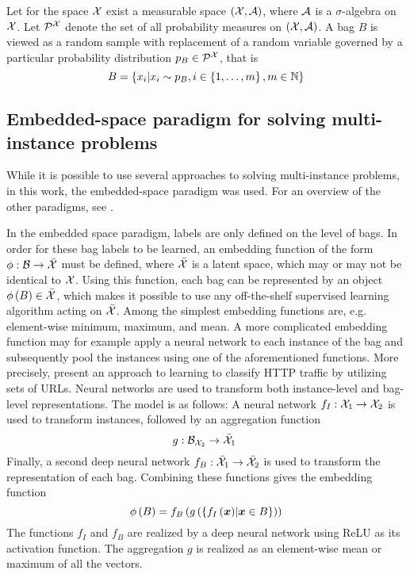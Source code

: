 Let for the space \( \mathcal{X} \) exist a measurable space \( \left( \mathcal{X}, \mathcal{A} \right) \), where \( \mathcal{A} \) is a \( \sigma \)-algebra on \( \mathcal{X} \). Let \( \mathcal{P}^\mathspace{X} \) denote the set of all probability measures on \( \left( \mathcal{X}, \mathcal{A} \right) \). A bag \( B \) is viewed as a random sample with replacement of a random variable governed by a particular probability distribution \( p_B \in \mathcal{P}^\mathspace{X} \), that is
\[ B = \left\{ x_i \middle| x_i \sim p_B, i \in \left\{ 1, \dots, m \right\}, m \in \mathbb{N} \right\} \]

\subsection{Embedded-space paradigm for solving multi-instance problems}\label{sec:embedded-space-paradigm}
While it is possible to use several approaches to solving multi-instance problems, in this work, the embedded-space paradigm was used. For an overview of the other paradigms, see \cite{dedic_optimalization_2020}.

In the embedded space paradigm, labels are only defined on the level of bags. In order for these bag labels to be learned, an embedding function of the form \( \phi : \mathcal{B} \to \bar{\mathcal{X}} \) must be defined, where \( \bar{\mathcal{X}} \) is a latent space, which may or may not be identical to \( \mathcal{X} \). Using this function, each bag can be represented by an object \( \phi \left( B \right) \in \bar{\mathcal{X}} \), which makes it possible to use any off-the-shelf supervised learning algorithm acting on \( \bar{\mathcal{X}} \). Among the simplest embedding functions are, e.g. element-wise minimum, maximum, and mean. A more complicated embedding function may for example apply a neural network to each instance of the bag and subsequently pool the instances using one of the aforementioned functions. More precisely, \cite{pevny_nested_2020} present an approach to learning to classify HTTP traffic by utilizing sets of URLs. Neural networks are used to transform both instance-level and bag-level representations. The model is as follows: A neural network \( f_I : \mathcal{X}_1 \to \mathcal{X}_2 \) is used to transform instances, followed by an aggregation function
\[ g: \mathcal{B}_{\mathcal{X}_2} \to \bar{\mathcal{X}}_1 \ \]
Finally, a second deep neural network \( f_B : \bar{\mathcal{X}}_1 \to \bar{\mathcal{X}}_2 \) is used to transform the representation of each bag. Combining these functions gives the embedding function
\[ \phi \left( B \right) = f_B \left( g \left( \left\{ f_I \left( \bm{x} \right) \middle| \bm{x} \in B \right\} \right) \right) \]
The functions \( f_I \) and \( f_B \) are realized by a deep neural network using ReLU as its activation function. The aggregation \( g \) is realized as an element-wise mean or maximum of all the vectors.

